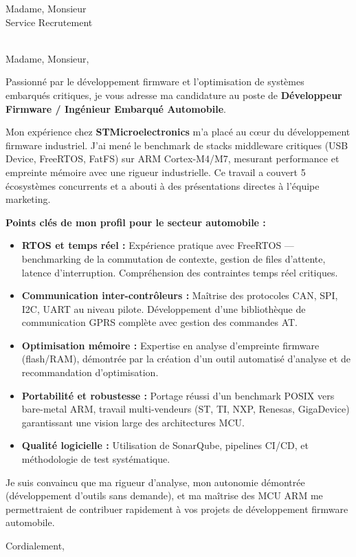 \documentclass[11pt,a4paper]{letter}
\begin{document}
\begin{letter}{Madame, Monsieur \\ Service Recrutement \\ [Nom de l'entreprise] \\ [Adresse]}

\opening{Madame, Monsieur,}

Passionn\'e par le d\'eveloppement firmware et l'optimisation de syst\`emes embarqu\'es critiques, je vous adresse ma candidature au poste de \textbf{D\'eveloppeur Firmware / Ing\'enieur Embarqu\'e Automobile}.

Mon exp\'erience chez \textbf{STMicroelectronics} m'a plac\'e au c\oe ur du d\'eveloppement firmware industriel. J'ai men\'e le benchmark de stacks middleware critiques (USB Device, FreeRTOS, FatFS) sur ARM Cortex-M4/M7, mesurant performance et empreinte m\'emoire avec une rigueur industrielle. Ce travail a couvert 5 \'ecosyst\`emes concurrents et a abouti \`a des pr\'esentations directes \`a l'\'equipe marketing.

\textbf{Points cl\'es de mon profil pour le secteur automobile :}

\begin{itemize}
\item \textbf{RTOS et temps r\'eel :} Exp\'erience pratique avec FreeRTOS --- benchmarking de la commutation de contexte, gestion de files d'attente, latence d'interruption. Compr\'ehension des contraintes temps r\'eel critiques.

\item \textbf{Communication inter-contr\^oleurs :} Ma\^itrise des protocoles CAN, SPI, I2C, UART au niveau pilote. D\'eveloppement d'une biblioth\`eque de communication GPRS compl\`ete avec gestion des commandes AT.

\item \textbf{Optimisation m\'emoire :} Expertise en analyse d'empreinte firmware (flash/RAM), d\'emontr\'ee par la cr\'eation d'un outil automatis\'e d'analyse et de recommandation d'optimisation.

\item \textbf{Portabilit\'e et robustesse :} Portage r\'eussi d'un benchmark POSIX vers bare-metal ARM, travail multi-vendeurs (ST, TI, NXP, Renesas, GigaDevice) garantissant une vision large des architectures MCU.

\item \textbf{Qualit\'e logicielle :} Utilisation de SonarQube, pipelines CI/CD, et m\'ethodologie de test syst\'ematique.
\end{itemize}

Je suis convaincu que ma rigueur d'analyse, mon autonomie d\'emontr\'ee (d\'eveloppement d'outils sans demande), et ma ma\^itrise des MCU ARM me permettraient de contribuer rapidement \`a vos projets de d\'eveloppement firmware automobile.

\closing{Cordialement,}

\end{letter}
\end{document}
